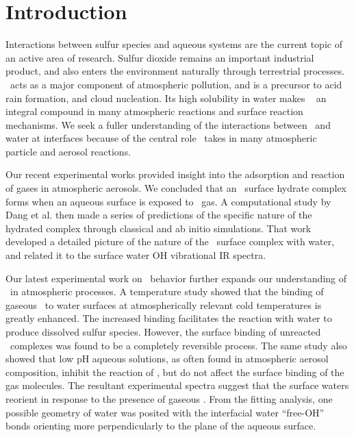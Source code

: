 \section{Introduction}

Interactions between sulfur species and aqueous systems are the current topic of an active area of research. Sulfur dioxide remains an important industrial product, and also enters the environment naturally through terrestrial processes. \suldiox~acts as a major component of atmospheric pollution, and is a precursor to acid rain formation, and cloud nucleation. Its high solubility in water makes \suldiox~ an integral compound in many atmospheric reactions and surface reaction mechanisms. We seek a fuller understanding of the interactions between \suldiox~and water at interfaces because of the central role \suldiox~takes in many atmospheric particle and aerosol reactions.

Our recent experimental works provided insight into the adsorption and reaction of gases in atmospheric aerosols.\cite{Tarbuck2005,Tarbuck2006} We concluded that an \suldiox~surface hydrate complex forms when an aqueous surface is exposed to \suldiox~gas. A computational study by Dang et al.\cite{Baer2010} then made a series of predictions of the specific nature of the hydrated complex through classical and ab initio simulations. That work developed a detailed picture of the nature of the \suldiox~surface complex with water, and related it to the surface water OH vibrational IR spectra.

Our latest experimental work on \suldiox~behavior further expands our understanding of \suldiox~in atmospheric processes.\cite{Ota2011} A temperature study showed that the binding of gaseous \suldiox~to water surfaces at atmospherically relevant cold temperatures is greatly enhanced. The increased binding facilitates the reaction with water to produce dissolved sulfur species. However, the surface binding of unreacted \suldiox~complexes was found to be a completely reversible process. The same study also showed that low pH aqueous solutions, as often found in atmospheric aerosol composition, inhibit the reaction of \suldiox, but do not affect the surface binding of the gas molecules. The resultant experimental spectra suggest that the surface waters reorient in response to the presence of gaseous \suldiox. From the fitting analysis, one possible geometry of water was posited with the interfacial water ``free-OH'' bonds orienting more perpendicularly to the plane of the aqueous surface. 

